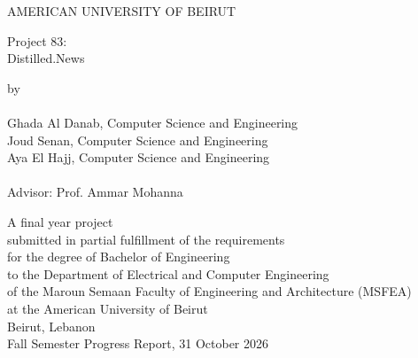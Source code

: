 \begin{titlepage}
\begin{center}
\LARGE{AMERICAN UNIVERSITY OF BEIRUT\\}
\vspace{3cm}

\LARGE{Project 83:\\
Distilled.News\\}
\vspace{2cm}

\normalsize{by\\ ~\\}
\Large{Ghada Al Danab, Computer Science and Engineering \\
Joud Senan, Computer Science and Engineering \\
Aya El Hajj, Computer Science and Engineering \\
~\\
Advisor: Prof. Ammar Mohanna\\
}
\vspace{2cm}

\normalsize{A final year project\\}
\normalsize{submitted in partial fulfillment of the requirements\\}
\normalsize{for the degree of Bachelor of Engineering\\}
\small{to the Department of Electrical and Computer Engineering\\}
\normalsize{of the Maroun Semaan Faculty of Engineering and Architecture (MSFEA)\\}
\normalsize{at the American University of Beirut\\}
\normalsize{Beirut, Lebanon\\}
\vspace{.4cm}
\normalsize{Fall Semester Progress Report, 31 October 2026}
\end{center}
\end{titlepage}
